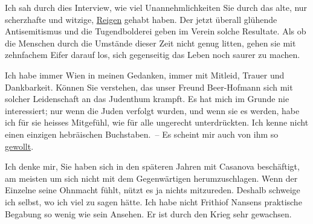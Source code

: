 \pstart
           Ich sah durch dies Interview,
               wie viel Unannehmlichkeiten Sie durch das alte, nur scherzhafte und witzige, \uline{Reigen} gehabt haben. Der jetzt überall glühende Antisemitismus und die Tugendbolderei
                  \introOben{}geben\introOben{} im Verein 
               solche Resultate. Als ob die Menschen durch die Umstände dieser Zeit nicht genug
               litten, gehen sie mit zehnfachem Eifer darauf los, sich gegenseitig das Leben noch
               saurer zu machen.\pend
           
\pstart
           Ich habe immer Wien in meinen Gedanken, immer mit
               Mitleid, Trauer und Dankbarkeit. Können Sie verstehen, das unser Freund Beer-Hofmann sich {\pb}mit solcher Leidenschaft an das
               Judenthum krampft. Es hat mich im Grunde nie interessiert; nur wenn die Juden
               verfolgt wurden, und wenn sie es werden, habe ich für sie heisses Mitgefühl, wie für
               alle ungerecht unterdrückten. Ich kenne nicht einen einzigen hebräischen
               Buchstaben. – Es scheint mir auch von ihm so \uline{gewollt}.\pend
           
\pstart
           Ich denke mir, Sie haben sich in den späteren Jahren mit Casanova beschäftigt, am meisten um sich nicht mit dem
               Gegenwärtigen herumzuschlagen. Wenn der Einzelne seine Ohnmacht fühlt, nützt es ja
               nichts mitzureden. Deshalb schweige ich selbst, wo ich viel zu sagen hätte. Ich habe
               nicht Frithiof Nansens praktische Begabung so
               wenig wie sein Ansehen. Er ist durch den Krieg sehr gewachsen.\pend
           
